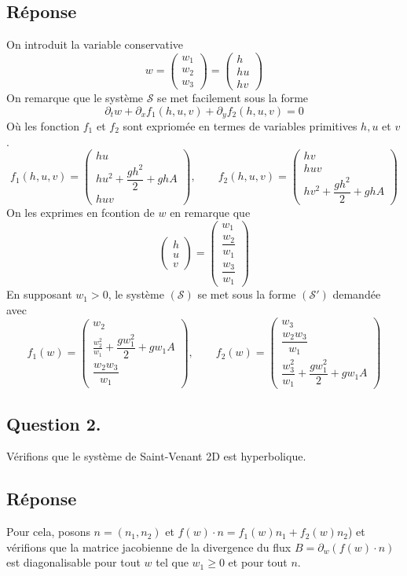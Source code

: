 \documentclass[
	french,
	11pt, %
]{fphw}
\newcommand{\myvec}[3]{\begin{pmatrix} #1  \\ #2 \\ #3 \end{pmatrix}}   %
\begin{document}
\subsection*{Réponse} 

On introduit la variable conservative 
$$w= \myvec{w_1}{w_2}{w_3} = \myvec{h}{hu}{hv}$$
On remarque que le système $\mathcal{S}$ se met facilement sous la forme
$$
\partial_t w + \partial_x f_1(h,u,v) + \partial_y f_2(h,u,v) = 0
$$
Où les fonction $f_1$ et $f_2$  sont expriomée en termes de variables primitives $h, u$ et $v$. 
$$f_1(h,u,v) = \myvec{hu}{hu^2 + \dfrac{gh^2}{2} + ghA}{huv}, \qquad f_2(h,u,v) = \myvec{hv}{huv}{hv^2 + \dfrac{gh^2}{2} + ghA}$$
On les exprimes en fcontion de $w$ en remarque que $$\myvec{h}{u}{v} = \myvec{w_1}{\dfrac{w_2}{w_1}}{\dfrac{w_3}{w_1}}$$
En supposant $w_1>0$, le système $(\mathcal{S})$ se met sous la forme $(\mathcal{S}')$ demandée avec 
$$f_1(w) = \myvec{w_2}{\frac{w_2^2}{w_1} + \dfrac{gw_1^2}{2} + gw_1A}{\dfrac{w_2w_3}{w_1}}, \qquad f_2(w) = \myvec{w_3}{\dfrac{w_2w_3}{w_1}}{\dfrac{w_3^2}{w_1} + \dfrac{gw_1^2}{2} + gw_1A}$$



\subsection*{Question 2.}

\begin{problem}
Vérifions que le système de Saint-Venant 2D est hyperbolique.
\end{problem}


\subsection*{Réponse} 
Pour cela, posons $n=(n_1,n_2)$ et $f(w)\cdot n = f_1(w)n_1 + f_2(w)n_2$) et vérifions que la matrice jacobienne de la divergence du flux $B = \partial_w \left( f(w)\cdot n \right)$ est diagonalisable pour tout $w$ tel que $w_1 \geq 0$ et pour tout $n$. 
\end{document}
